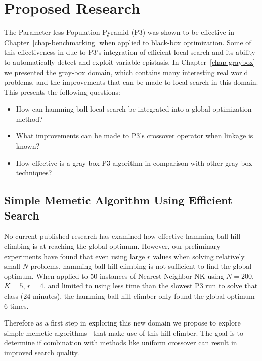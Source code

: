 \chapter{Proposed Research}
The Parameter-less Population Pyramid (P3) was shown to be effective in Chapter~\ref{chap-benchmarking}
when applied to black-box optimization. Some of this effectiveness in due to P3's integration of
efficient local search and its ability to automatically detect and exploit variable epistasis.
In Chapter~\ref{chap-graybox} we presented the gray-box domain, which contains many interesting
real world problems, and the improvements that can be made to local search in this domain.
This presents the following questions:

\begin{itemize}
\item How can hamming ball local search be integrated into a global optimization method?
\item What improvements can be made to P3's crossover operator when linkage is known?
\item How effective is a gray-box P3 algorithm in comparison with other gray-box techniques?
\end{itemize}

\section{Simple Memetic Algorithm Using Efficient Search}
No current published research has examined how effective hamming ball hill climbing is at reaching the global
optimum. However, our preliminary experiments have found that even using large $r$ values when solving relatively small $N$
problems, hamming ball hill climbing is not sufficient to find the global optimum. When applied to 50 instances
of Nearest Neighbor NK using $N=200$, $K=5$, $r=4$, and limited to using less time than the slowest P3 run to solve that class (24 minutes),
the hamming ball hill climber only found the global optimum 6 times.

Therefore as a first step in exploring this new domain we propose to explore simple memetic algorithms~\cite{chen:2011:memetic}
that make use of this hill climber. The goal is to determine if combination with methods like uniform crossover
can result in improved search quality.

